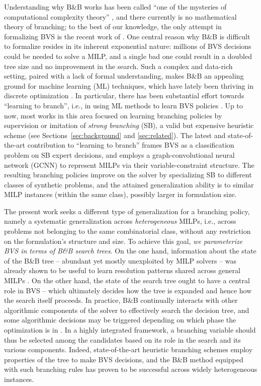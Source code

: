 \documentclass[letterpaper]{article} %
\begin{document}
Understanding why B\&B works has been called ``one of the mysteries of computational complexity theory'' \cite{WhyDoesBBWork}, and there currently is no mathematical theory of branching; to the best of our knowledge, the only attempt in formalizing BVS is the recent work of \citeauthor{le2015abstract}. 
One central reason why B\&B is difficult to formalize resides in its inherent exponential nature: millions of BVS decisions could be needed to solve a MILP, and a single bad one could result in a doubled tree size and no improvement in the search. 
Such a complex and data-rich setting, paired with a lack of formal understanding, makes B\&B an appealing ground for machine learning (ML) techniques, which have lately been thriving in discrete optimization \cite{BLP18}. 
In particular, there has been substantial effort towards ``learning to branch'', i.e., in using ML methods to learn BVS policies \cite{Lodi2017}. 
Up to now, most works in this area focused on learning branching policies by supervision or imitation of \emph{strong branching} (SB), a valid but expensive heuristic scheme (see Sections~\ref{sec:background} and \ref{sec:related}).
The latest and state-of-the-art contribution to ``learning to branch'' \cite{NIPS2019_9690} frames BVS as a classification problem on SB expert decisions, and employs a graph-convolutional neural network (GCNN) to represent MILPs via their variable-constraint structure. 
The resulting branching policies improve on the solver by specializing SB to different classes of synthetic problems, and the attained generalization ability is to similar MILP instances (within the same class), possibly larger in formulation size.

The present work seeks a different type of generalization for a branching policy, namely a systematic generalization across \emph{heterogeneous} MILPs, i.e., across problems not belonging to the same combinatorial class, without any restriction on the formulation's structure and size. 
To achieve this goal, \emph{we parameterize BVS in terms of B\&B search trees}. 
On the one hand, information about the state of the B\&B tree -- abundant yet mostly unexploited by MILP solvers -- was already shown to be useful to learn resolution patterns shared across general MILPs \cite{MILPOutcome}. 
On the other hand, the state of the search tree ought to have a central role in BVS -- which ultimately decides how the tree is expanded and hence how the search itself proceeds. 
In practice, B\&B continually interacts with other algorithmic components of the solver to effectively search the decision tree, and some algorithmic decisions may be triggered depending on which phase the optimization is in \cite{BertholdHendelKoch2017}. 
In a highly integrated framework, a branching variable should thus be selected among the candidates based on its role in the search and its various components. 
Indeed, state-of-the-art heuristic branching schemes employ properties of the tree to make BVS decisions, and the B\&B method equipped with such branching rules has proven to be successful across widely heterogeneous instances. 
\end{document}
